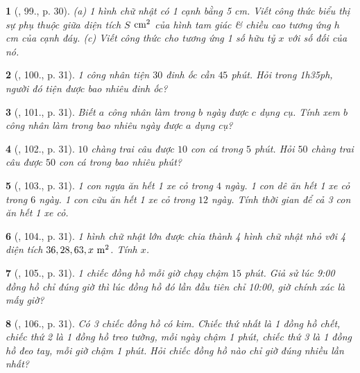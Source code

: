 \documentclass{article}
\newtheorem{baitoan}{}
\begin{document}
\begin{baitoan}[\cite{Binh_Toan_7_tap_1}, 99., p. 30]
	(a) 1 hình chữ nhật có 1 cạnh bằng {\rm5 cm}. Viết công thức biểu thị sự phụ thuộc giữa diện tích $S$ $\rm cm^2$ của hình tam giác \& chiều cao tương ứng $h$ {\rm cm} của cạnh đáy. (c) Viết công thức cho tương ứng 1 số hữu tỷ $x$ với số đối của nó.
\end{baitoan}

\begin{baitoan}[\cite{Binh_Toan_7_tap_1}, 100., p. 31]
	1 công nhân tiện $30$ đinh ốc cần $45$ phút. Hỏi trong {\rm1h35ph}, người đó tiện được bao nhiêu đinh ốc?
\end{baitoan}

\begin{baitoan}[\cite{Binh_Toan_7_tap_1}, 101., p. 31]
	Biết $a$ công nhân làm trong $b$ ngày được $c$ dụng cụ. Tính xem $b$ công nhân làm trong bao nhiêu ngày được $a$ dụng cụ?
\end{baitoan}

\begin{baitoan}[\cite{Binh_Toan_7_tap_1}, 102., p. 31]
	$10$ chàng trai câu được $10$ con cá trong $5$ phút. Hỏi $50$ chàng trai câu được $50$ con cá trong bao nhiêu phút?
\end{baitoan}

\begin{baitoan}[\cite{Binh_Toan_7_tap_1}, 103., p. 31]
	1 con ngựa ăn hết 1 xe cỏ trong $4$ ngày. 1 con dê ăn hết 1 xe cỏ trong $6$ ngày. 1 con cữu ăn hết 1 xe cỏ trong $12$ ngày. Tính thời gian để cả 3 con ăn hết 1 xe cỏ.
\end{baitoan}

\begin{baitoan}[\cite{Binh_Toan_7_tap_1}, 104., p. 31]
	1 hình chữ nhật lớn được chia thành 4 hình chữ nhật nhỏ với 4 diện tích $36,28,63,x\ {\rm m^2}$. Tính $x$.
\end{baitoan}

\begin{baitoan}[\cite{Binh_Toan_7_tap_1}, 105., p. 31]
	1 chiếc đồng hồ mỗi giờ chạy chậm $15$ phút. Giả sử lúc {\rm9:00} đồng hồ chỉ đúng giờ thì lúc đồng hồ đó lần đầu tiên chỉ {\rm10:00}, giờ chính xác là mấy giờ?
\end{baitoan}

\begin{baitoan}[\cite{Binh_Toan_7_tap_1}, 106., p. 31]
	Có 3 chiếc đồng hồ có kim. Chiếc thứ nhất là 1 đồng hồ chết, chiếc thứ 2 là 1 đồng hồ treo tường, mỗi ngày chậm 1 phút, chiếc thứ 3 là 1 đồng hồ đeo tay, mỗi giờ chậm 1 phút. Hỏi chiếc đồng hồ nào chỉ giờ đúng nhiều lần nhất?
\end{baitoan}
\end{document}
